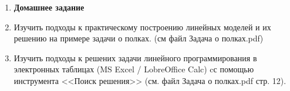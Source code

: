 \documentclass[a5paper,14pt]{extarticle}
\begin{document}
\begin{enumerate}
%

\item[]\textbf{Домашнее задание}
\item Изучить подходы к практическому построению линейных моделей и их решению на примере задачи о полках. (см файл Задача о полках.pdf)

\item Изучить подходы к решених задачи линейного программирования в электронных таблицах (MS Excel / LobreOffice Calc) cс помощью инструмента <<Поиск решения>> (см. файл Задача о полках.pdf стр. 12).


\end{enumerate}
\end{document}
